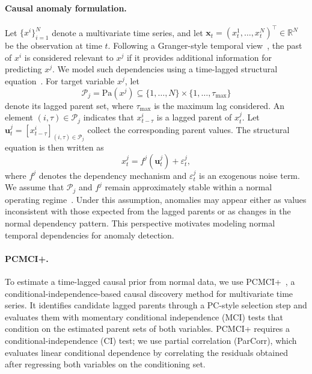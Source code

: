 \documentclass[letterpaper]{article}
\begin{document}
\paragraph{Causal anomaly formulation.}
Let $\{x^i\}_{i=1}^{N}$ denote a multivariate time series, and let $\mathbf{x}_t=(x^1_t,\ldots,x^N_t)^\top\in\mathbb{R}^N$ be the observation at time $t$. Following a Granger-style temporal view~\cite{granger1969}, the past of $x^i$ is considered relevant to $x^j$ if it provides additional information for predicting $x^j$. We model such dependencies using a time-lagged structural equation~\cite{peters2017elements,runge2019science}. For target variable $x^j$, let
\[
\mathcal{P}_j=\mathrm{Pa}(x^j)\subseteq\{1,\ldots,N\}\times\{1,\ldots,\tau_{\max}\}
\]
denote its lagged parent set, where $\tau_{\max}$ is the maximum lag considered. An element $(i,\tau)\in\mathcal{P}_j$ indicates that $x^i_{t-\tau}$ is a lagged parent of $x^j_t$. Let $\mathbf{u}^j_t=[x^i_{t-\tau}]_{(i,\tau)\in\mathcal{P}_j}$ collect the corresponding parent values. The structural equation is then written as
\begin{equation}
x^j_t=f^j(\mathbf{u}^j_t)+\varepsilon^j_t,
\label{eq:sem}
\end{equation}
where $f^j$ denotes the dependency mechanism and $\varepsilon^j_t$ is an exogenous noise term. We assume that $\mathcal{P}_j$ and $f^j$ remain approximately stable within a normal operating regime~\cite{absar2021invariant,han2025rootcause}. Under this assumption, anomalies may appear either as values inconsistent with those expected from the lagged parents or as changes in the normal dependency pattern. This perspective motivates modeling normal temporal dependencies for anomaly detection.

\paragraph{PCMCI+.}
To estimate a time-lagged causal prior from normal data, we use PCMCI+~\cite{runge2020pcmciplus}, a conditional-independence-based causal discovery method for multivariate time series. It identifies candidate lagged parents through a PC-style selection step and evaluates them with momentary conditional independence (MCI) tests that condition on the estimated parent sets of both variables. PCMCI+ requires a conditional-independence (CI) test; we use partial correlation (ParCorr), which evaluates linear conditional dependence by correlating the residuals obtained after regressing both variables on the conditioning set.
\end{document}

